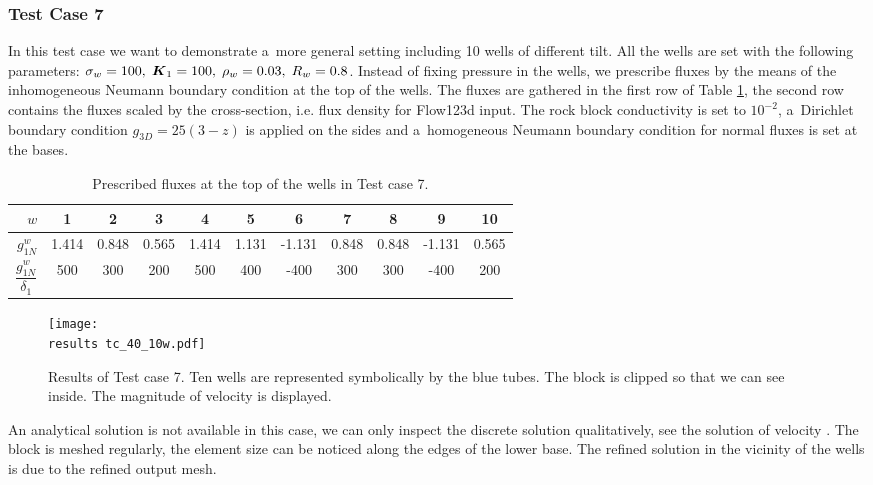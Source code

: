 \subsubsection{Test Case 7}
In this test case we want to demonstrate a~more general setting including 10 wells of different tilt.
All the wells are set with the following parameters: $\sigma_w=100,\; \mathbf{\boldsymbol{K}}_1=100,\; \rho_w=0.03,\; R_w=0.8$.
Instead of fixing pressure in the wells, we prescribe fluxes by the means of the inhomogeneous Neumann boundary condition
at the top of the wells. The fluxes are gathered in the first row of Table \ref{tab:tc7_data}, the second row
contains the fluxes scaled by the cross-section, i.e. flux density for Flow123d input.
The rock block conductivity is set to $10^{-2}$, a~Dirichlet boundary condition $g_{3D}=25(3-z)$
is applied on the sides and a~homogeneous Neumann boundary condition for normal fluxes is set at the bases.
%
\begin{table}[!htb]
\begin{center}
\begin{tabular}{r|cccccccccc}
\toprule
$w$ & 1  & 2 & 3 & 4 & 5 & 6 & 7 & 8 & 9 & 10\\ \midrule
$g^w_{1N}$ & 1.414 & 0.848 & 0.565 & 1.414 & 1.131 & -1.131 & 0.848 & 0.848 & -1.131 & 0.565\\[8pt]
$\dfrac{g^w_{1N}}{\delta_1}$ & 500  & 300 & 200 & 500 & 400 & -400 & 300 & 300 & -400 & 200\\[8pt]
\bottomrule
\end{tabular}
\caption{Prescribed fluxes at the top of the wells in Test case 7.}
\label{tab:tc7_data}
\end{center}
\end{table}

\begin{figure}[!htb]
    \centering
    \texttt{[image: \\results tc\_40\_10w.pdf]}
    \caption[Error distribution in Test case 7.]
    {Results of Test case 7. Ten wells are represented symbolically by the blue tubes.
    The block is clipped so that we can see inside. The magnitude of velocity is displayed.}
    \label{fig:mh_tc7_error}
\end{figure}

An analytical solution is not available in this case, we can only inspect the discrete solution qualitatively,
see the solution of velocity .
The block is meshed regularly, the element size can be noticed along the edges of the lower base.
The refined solution in the vicinity of the wells is due to the refined output mesh.

